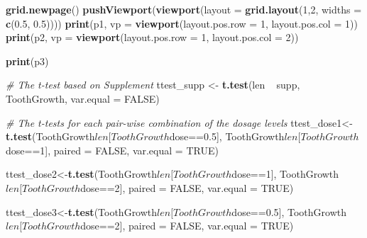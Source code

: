 \documentclass[]{article}
\newenvironment{Shaded}{\begin{snugshade}}{\end{snugshade}}
\newcommand{\KeywordTok}[1]{\textcolor[rgb]{0.13,0.29,0.53}{\textbf{{#1}}}}
\newcommand{\DataTypeTok}[1]{\textcolor[rgb]{0.13,0.29,0.53}{{#1}}}
\newcommand{\DecValTok}[1]{\textcolor[rgb]{0.00,0.00,0.81}{{#1}}}
\newcommand{\FloatTok}[1]{\textcolor[rgb]{0.00,0.00,0.81}{{#1}}}
\newcommand{\StringTok}[1]{\textcolor[rgb]{0.31,0.60,0.02}{{#1}}}
\newcommand{\CommentTok}[1]{\textcolor[rgb]{0.56,0.35,0.01}{\textit{{#1}}}}
\newcommand{\OtherTok}[1]{\textcolor[rgb]{0.56,0.35,0.01}{{#1}}}
\newcommand{\NormalTok}[1]{{#1}}
\begin{document}
\begin{Shaded}
\begin{Highlighting}[]
\KeywordTok{grid.newpage}\NormalTok{()}
\KeywordTok{pushViewport}\NormalTok{(}\KeywordTok{viewport}\NormalTok{(}\DataTypeTok{layout =} \KeywordTok{grid.layout}\NormalTok{(}\DecValTok{1}\NormalTok{,}\DecValTok{2}\NormalTok{, }\DataTypeTok{widths =} \KeywordTok{c}\NormalTok{(}\FloatTok{0.5}\NormalTok{, }\FloatTok{0.5}\NormalTok{))))}
\KeywordTok{print}\NormalTok{(p1, }\DataTypeTok{vp =} \KeywordTok{viewport}\NormalTok{(}\DataTypeTok{layout.pos.row =} \DecValTok{1}\NormalTok{, }\DataTypeTok{layout.pos.col =} \DecValTok{1}\NormalTok{))}
\KeywordTok{print}\NormalTok{(p2, }\DataTypeTok{vp =} \KeywordTok{viewport}\NormalTok{(}\DataTypeTok{layout.pos.row =} \DecValTok{1}\NormalTok{, }\DataTypeTok{layout.pos.col =} \DecValTok{2}\NormalTok{))}

\KeywordTok{print}\NormalTok{(p3)}

\CommentTok{# The t-test based on Supplement}
\NormalTok{ttest_supp <-}\StringTok{ }\KeywordTok{t.test}\NormalTok{(len ~}\StringTok{ }\NormalTok{supp, ToothGrowth, }\DataTypeTok{var.equal =} \OtherTok{FALSE}\NormalTok{)}

\CommentTok{# The t-tests for each pair-wise combination of the dosage levels}
\NormalTok{ttest_dose1<-}\KeywordTok{t.test}\NormalTok{(ToothGrowth$len[ToothGrowth$dose==}\FloatTok{0.5}\NormalTok{], }
                    \NormalTok{ToothGrowth$len[ToothGrowth$dose==}\DecValTok{1}\NormalTok{], }
                    \DataTypeTok{paired =} \OtherTok{FALSE}\NormalTok{, }\DataTypeTok{var.equal =} \OtherTok{TRUE}\NormalTok{)}

\NormalTok{ttest_dose2<-}\KeywordTok{t.test}\NormalTok{(ToothGrowth$len[ToothGrowth$dose==}\DecValTok{1}\NormalTok{], }
                    \NormalTok{ToothGrowth$len[ToothGrowth$dose==}\DecValTok{2}\NormalTok{], }
                    \DataTypeTok{paired =} \OtherTok{FALSE}\NormalTok{, }\DataTypeTok{var.equal =} \OtherTok{TRUE}\NormalTok{)}

\NormalTok{ttest_dose3<-}\KeywordTok{t.test}\NormalTok{(ToothGrowth$len[ToothGrowth$dose==}\FloatTok{0.5}\NormalTok{], }
                    \NormalTok{ToothGrowth$len[ToothGrowth$dose==}\DecValTok{2}\NormalTok{], }
                    \DataTypeTok{paired =} \OtherTok{FALSE}\NormalTok{, }\DataTypeTok{var.equal =} \OtherTok{TRUE}\NormalTok{)}


\end{Highlighting}
\end{Shaded}
\end{document}
